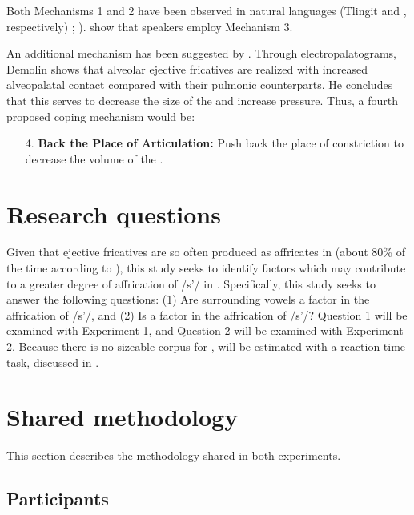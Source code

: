 \documentclass[output=paper
,newtxmath
,modfonts
,nonflat]{langsci/langscibook}
\begin{document}
Both Mechanisms 1 and 2 have been observed in natural languages (Tlingit and , respectively) \citealt{MaddiesonEtAl2001}; \citealt{maddieson1998make}). \citet{shosted2011affricating} show that  speakers employ Mechanism 3.

An additional mechanism has been suggested by \citet{demolin2002search}. Through electropalatograms, Demolin shows that  alveolar ejective fricatives are realized with increased alveopalatal contact compared with their pulmonic counterparts. He concludes that this serves to decrease the size of the  and increase pressure. Thus, a fourth proposed coping mechanism would be:

\begin{enumerate}
	\item[4.] \textbf{Back the Place of Articulation:} Push back the place of constriction to decrease the volume of the  \citep{demolin2002search}.
\end{enumerate}
	
\section{Research questions}\label{sec:moeng:3}

Given that ejective fricatives are so often produced as affricates in  (about 80\% of the time according to \citealt{shosted2011affricating}), this study seeks to identify factors which may contribute to a greater degree of affrication of /s’/ in . Specifically, this study seeks to answer the following questions: (1) Are surrounding vowels a factor in the affrication of /s’/, and (2) Is  a factor in the affrication of /s’/? Question 1 will be examined with Experiment 1, and Question 2 will be examined with Experiment 2. Because there is no sizeable corpus for ,  will be estimated with a reaction time task, discussed in .

\section{Shared methodology}\label{sec:moeng:4}

This section describes the methodology shared in both experiments.

\subsection{Participants}\label{sec:moeng:4.1}
\end{document}
